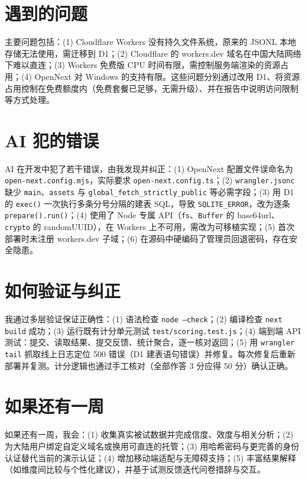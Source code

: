 \documentclass[11pt,a4paper]{ctexart}
\begin{document}
\section{遇到的问题}

主要问题包括：(1) Cloudflare Workers 没有持久文件系统，原来的 JSONL 本地存储无法使用，需迁移到 D1；(2) Cloudflare 的 workers.dev 域名在中国大陆网络下难以直连；(3) Workers 免费版 CPU 时间有限，需控制服务端渲染的资源占用；(4) OpenNext 对 Windows 的支持有限。这些问题分别通过改用 D1、将资源占用控制在免费额度内（免费套餐已足够，无需升级）、并在报告中说明访问限制等方式处理。

\section{AI 犯的错误}

AI 在开发中犯了若干错误，由我发现并纠正：(1) OpenNext 配置文件误命名为 \texttt{open-next.config.mjs}，实际要求 \texttt{open-next.config.ts}；(2) \texttt{wrangler.jsonc} 缺少 \texttt{main}、\texttt{assets} 与 \texttt{global\_fetch\_strictly\_public} 等必需字段；(3) 用 D1 的 \texttt{exec()} 一次执行多条分号分隔的建表 SQL，导致 \texttt{SQLITE\_ERROR}，改为逐条 \texttt{prepare().run()}；(4) 使用了 Node 专属 API（\texttt{fs}、\texttt{Buffer} 的 base64url、\texttt{crypto} 的 randomUUID），在 Workers 上不可用，需改为可移植实现；(5) 首次部署时未注册 workers.dev 子域；(6) 在源码中硬编码了管理员回退密码，存在安全隐患。

\section{如何验证与纠正}

我通过多层验证保证正确性：(1) 语法检查 \texttt{node --check}；(2) 编译检查 \texttt{next build} 成功；(3) 运行既有计分单元测试 \texttt{test/scoring.test.js}；(4) 端到端 API 测试：提交、读取结果、提交反馈、统计聚合，逐一核对返回；(5) 用 \texttt{wrangler tail} 抓取线上日志定位 500 错误（D1 建表语句错误）并修复。每次修复后重新部署并复测。计分逻辑也通过手工核对（全部作答 3 分应得 50 分）确认正确。

\section{如果还有一周}

如果还有一周，我会：(1) 收集真实被试数据并完成信度、效度与相关分析；(2) 为大陆用户绑定自定义域名或换用可直连的托管；(3) 用哈希密码与更完善的身份认证替代当前的演示认证；(4) 增加移动端适配与无障碍支持；(5) 丰富结果解释（如维度间比较与个性化建议），并基于试测反馈迭代问卷措辞与交互。
\end{document}
